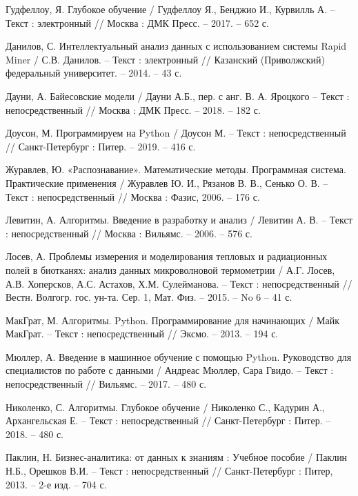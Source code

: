 \begin{thebibliography}{3}
	 Гудфеллоу, Я.  Глубокое обучение / Гудфеллоу Я., Бенджио И., Курвилль А. -- Текст : электронный // Москва : ДМК Пресс. -- 2017. -- 652 с.	
	
	 Данилов, С.  Интеллектуальный анализ данных с использованием системы Rapid
	Miner / С.В. Данилов. -- Текст : электронный // Казанский (Приволжский) федеральный университет. -- 2014. -- 43 с.			
	
	 Дауни, А. Байесовские модели / Дауни А.Б., пер. с анг. В. А. Яроцкого -- Текст : непосредственный // Москва : ДМК Пресс. -- 2018. -- 182 с.				
	
	 Доусон, М. Программируем на Python / Доусон М. -- Текст : непосредственный // Санкт-Петербург : Питер. -- 2019. -- 416 с.	
	
	 Журавлев, Ю. «Распознавание». Математические методы. Программная система. Практические применения / Журавлев Ю. И., Рязанов В. В., Сенько О. В. -- Текст : непосредственный // Москва : Фазис, 2006. -- 176 с.
	
	 Левитин, А. Алгоритмы. Введение в разработку и анализ / Левитин А. В. -- Текст : непосредственный // Москва : Вильямс. -- 2006. -- 576 с.		
	
	 Лосев, А. Проблемы измерения и моделирования тепловых и радиационных полей в биотканях: анализ данных микроволновой термометрии / А.Г. Лосев, А.В. Хоперсков, А.С. Астахов, Х.М. Сулейманова. -- Текст : непосредственный // Вестн. Волгогр. гос. ун-та. Сер. 1, Мат. Физ. -- 2015. -- No 6 -- 41 с.						
	
	 МакГрат, М. Алгоритмы. Python. Программирование для начинающих / Майк МакГрат. -- Текст : непосредственный // Эксмо. -- 2013. -- 194 с.							
	
	 Мюллер, А. Введение в машинное обучение с помощью Python. Руководство для специалистов по работе с данными / Андреас Мюллер, Сара Гвидо. -- Текст : непосредственный // Вильямс. -- 2017. -- 480 с.				
	
	 Николенко, С. Алгоритмы. Глубокое обучение / Николенко С., Кадурин А., Архангельская Е. -- Текст : непосредственный // Санкт-Петербург : Питер. -- 2018. -- 480 с.
	
	 Паклин, Н. Бизнес-аналитика: от данных к знаниям : Учебное пособие / Паклин Н.Б., Орешков В.И. -- Текст : непосредственный // Санкт-Петербург : Питер, 2013. -- 2-е изд. -- 704 с.
	

\end{thebibliography}
